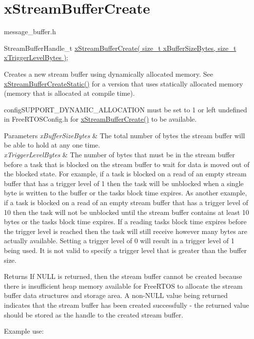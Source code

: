 \hypertarget{group__xStreamBufferCreate}{}\section{x\+Stream\+Buffer\+Create}
\label{group__xStreamBufferCreate}
message\+\_\+buffer.\+h


\begin{DoxyPre}
StreamBufferHandle\_t \hyperlink{stream__buffer_8h_a39aa4dd8b83e2df7ded291f863fb5fed}{xStreamBufferCreate( size\_t xBufferSizeBytes, size\_t xTriggerLevelBytes )};
\end{DoxyPre}


Creates a new stream buffer using dynamically allocated memory. See \hyperlink{stream__buffer_8h_a3c248575ac1b83801db605b32a118f77}{x\+Stream\+Buffer\+Create\+Static()} for a version that uses statically allocated memory (memory that is allocated at compile time).

config\+S\+U\+P\+P\+O\+R\+T\+\_\+\+D\+Y\+N\+A\+M\+I\+C\+\_\+\+A\+L\+L\+O\+C\+A\+T\+I\+ON must be set to 1 or left undefined in Free\+R\+T\+O\+S\+Config.\+h for \hyperlink{stream__buffer_8h_a39aa4dd8b83e2df7ded291f863fb5fed}{x\+Stream\+Buffer\+Create()} to be available.


\begin{DoxyParams}{Parameters}
{\em x\+Buffer\+Size\+Bytes} & The total number of bytes the stream buffer will be able to hold at any one time.\\
\hline
{\em x\+Trigger\+Level\+Bytes} & The number of bytes that must be in the stream buffer before a task that is blocked on the stream buffer to wait for data is moved out of the blocked state. For example, if a task is blocked on a read of an empty stream buffer that has a trigger level of 1 then the task will be unblocked when a single byte is written to the buffer or the task\textquotesingle{}s block time expires. As another example, if a task is blocked on a read of an empty stream buffer that has a trigger level of 10 then the task will not be unblocked until the stream buffer contains at least 10 bytes or the task\textquotesingle{}s block time expires. If a reading task\textquotesingle{}s block time expires before the trigger level is reached then the task will still receive however many bytes are actually available. Setting a trigger level of 0 will result in a trigger level of 1 being used. It is not valid to specify a trigger level that is greater than the buffer size.\\
\hline
\end{DoxyParams}
\begin{DoxyReturn}{Returns}
If N\+U\+LL is returned, then the stream buffer cannot be created because there is insufficient heap memory available for Free\+R\+T\+OS to allocate the stream buffer data structures and storage area. A non-\/\+N\+U\+LL value being returned indicates that the stream buffer has been created successfully -\/ the returned value should be stored as the handle to the created stream buffer.
\end{DoxyReturn}
Example use\+: 
\begin{DoxyPre}\end{DoxyPre}




